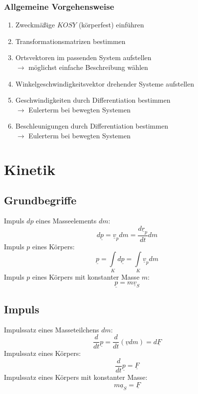 \documentclass[a4paper,twocolumn,10pt]{article}
\begin{document}
\subsubsection{Allgemeine Vorgehensweise}
\begin{enumerate}
\item Zweckmäßige $KOSY$ (körperfest) einführen
\item Transformationsmatrizen bestimmen
\item Ortsvektoren im passenden System aufstellen\\
$\rightarrow$ möglichst einfache Beschreibung wählen
\item Winkelgeschwindigkeitsvektor drehender Systeme aufstellen
\item Geschwindigkeiten durch Differentiation bestimmen\\
$\rightarrow$ Eulerterm bei bewegten Systemen
\item Beschleunigungen durch Differentiation bestimmen\\
$\rightarrow$ Eulerterm bei bewegten Systemen
\end{enumerate}

\section{Kinetik}

\subsection{Grundbegriffe}
Impuls $dp$ eines Masseelements $dm$:
\begin{equation*}
d\underline{p}=\underline{v}_pdm=\frac{d\underline{r}_p}{dt}dm
\end{equation*}
Impuls $p$ eines Körpers:
\begin{equation*}
\underline{p}=\int\limits_Kd\underline{p}=\int\limits_K\underline{v}_pdm
\end{equation*}
Impuls $p$ eines Körpers mit konstanter Masse $m$:
\begin{equation*}
\underline{p}=m\underline{v}_S
\end{equation*}

\subsection{Impuls}
Impulssatz eines Masseteilchens $dm$:
\begin{equation*}
\frac{d}{dt}\underline{p}=\frac{d}{dt}(\underline{v}dm)=d\underline{F}
\end{equation*}
Impulssatz eines Körpers:
\begin{equation*}
\frac{d}{dt}\underline{p}=\underline{F}
\end{equation*}
Impulssatz eines Körpers mit konstanter Masse:
\begin{equation*}
m\underline{a}_S=\underline{F}
\end{equation*}
\end{document}
